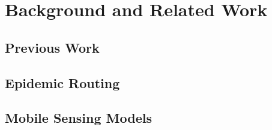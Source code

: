 \chapter{Background and Related Work}\label{background}



\section{Previous Work}\label{background_previous_work}
\section{Epidemic Routing}\label{background_epidemic_routing}

\section{Mobile Sensing Models}\label{background_mobile_sensing_models}

